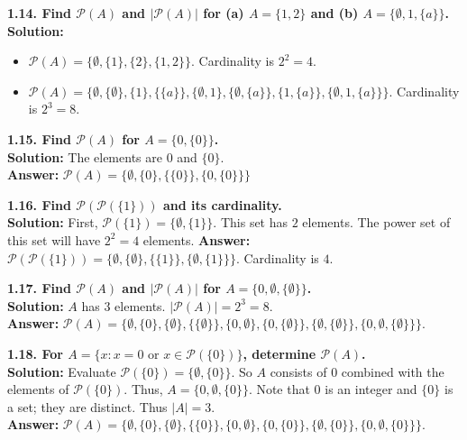 \documentclass[12pt]{article}
\begin{document}
\vspace{0.5cm}
\textbf{1.14. Find $\mathcal{P}(A)$ and $|\mathcal{P}(A)|$ for (a) $A = \{1, 2\}$ and (b) $A = \{\emptyset, 1, \{a\}\}$.} \\
\textbf{Solution:}
\begin{itemize}
    \item[(a)] $\mathcal{P}(A) = \{\emptyset, \{1\}, \{2\}, \{1, 2\}\}$. Cardinality is $2^2 = 4$.
    \item[(b)] $\mathcal{P}(A) = \{\emptyset, \{\emptyset\}, \{1\}, \{\{a\}\}, \{\emptyset, 1\}, \{\emptyset, \{a\}\}, \{1, \{a\}\}, \{\emptyset, 1, \{a\}\}\}$. Cardinality is $2^3 = 8$.
\end{itemize}

\vspace{0.5cm}
\textbf{1.15. Find $\mathcal{P}(A)$ for $A = \{0, \{0\}\}$.} \\
\textbf{Solution:} The elements are $0$ and $\{0\}$. \\
\textbf{Answer:} $\mathcal{P}(A) = \{\emptyset, \{0\}, \{\{0\}\}, \{0, \{0\}\}\}$

\vspace{0.5cm}
\textbf{1.16. Find $\mathcal{P}(\mathcal{P}(\{1\}))$ and its cardinality.} \\
\textbf{Solution:} First, $\mathcal{P}(\{1\}) = \{\emptyset, \{1\}\}$. This set has $2$ elements.
The power set of this set will have $2^2 = 4$ elements.
\textbf{Answer:} $\mathcal{P}(\mathcal{P}(\{1\})) = \{\emptyset, \{\emptyset\}, \{\{1\}\}, \{\emptyset, \{1\}\}\}$. Cardinality is $4$.

\vspace{0.5cm}
\textbf{1.17. Find $\mathcal{P}(A)$ and $|\mathcal{P}(A)|$ for $A = \{0, \emptyset, \{\emptyset\}\}$.} \\
\textbf{Solution:} $A$ has $3$ elements. $|\mathcal{P}(A)| = 2^3 = 8$. \\
\textbf{Answer:} $\mathcal{P}(A) = \{\emptyset, \{0\}, \{\emptyset\}, \{\{\emptyset\}\}, \{0, \emptyset\}, \{0, \{\emptyset\}\}, \{\emptyset, \{\emptyset\}\}, \{0, \emptyset, \{\emptyset\}\}\}$.

\vspace{0.5cm}
\textbf{1.18. For $A = \{x : x = 0 \text{ or } x \in \mathcal{P}(\{0\})\}$, determine $\mathcal{P}(A)$.} \\
\textbf{Solution:} Evaluate $\mathcal{P}(\{0\}) = \{\emptyset, \{0\}\}$.
So $A$ consists of $0$ combined with the elements of $\mathcal{P}(\{0\})$. Thus, $A = \{0, \emptyset, \{0\}\}$. Note that $0$ is an integer and $\{0\}$ is a set; they are distinct. Thus $|A| = 3$. \\
\textbf{Answer:} $\mathcal{P}(A) = \{\emptyset, \{0\}, \{\emptyset\}, \{\{0\}\}, \{0, \emptyset\}, \{0, \{0\}\}, \{\emptyset, \{0\}\}, \{0, \emptyset, \{0\}\}\}$.
\end{document}
